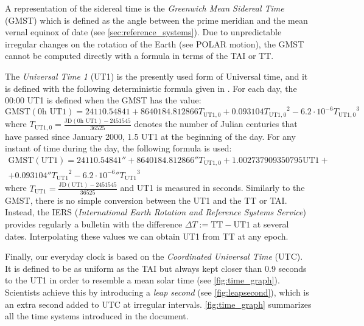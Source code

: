 \documentclass[../main.tex]{subfiles}
\begin{document}
A representation of the sidereal time is the \emph{Greenwich Mean Sidereal Time} (GMST) which is defined as the angle between the prime meridian and the mean vernal equinox of date (see \cref{sec:reference_systems}). Due to unpredictable irregular changes on the rotation of the Earth (see POLAR motion), the GMST cannot be computed directly with a formula in terms of the TAI or TT.

The \emph{Universal Time 1} (UT1) is the presently used form of Universal time, and it is defined with the following deterministic formula given in \cite{aoki}. For each day, the 00:00 UT1 is defined when the GMST has the value:
\begin{equation}
  \mathrm{GMST}(0\text{h UT1})=24110.54841+8640184.812866{T_{\text{UT1},0}}+0.093104{T_{\text{UT1},0}}^2-6.2\cdot 10^{-6}{T_{\text{UT1},0}}^3
\end{equation}
where $T_{\text{UT1},0}=\frac{\text{JD}(0\text{h UT1})-2451545}{36525}$ denotes the number of Julian centuries that have passed since January 2000, 1.5 UT1 at the beginning of the day. For any instant of time during the day, the following formula is used:
\begin{multline}
  \mathrm{GMST}(\mathrm{UT1})=24110.54841''+8640184.812866''{T_{\text{UT1},0}}+1.002737909350795\text{UT1}+\\+0.093104''{T_{\text{UT1}}}^2-{6.2\cdot 10^{-6}}''{T_{\text{UT1}}}^3
\end{multline}
where $T_\text{UT1}=\frac{\text{JD}(\text{UT1})-2451545}{36525}$ and UT1 is measured in seconds. Similarly to the GMST, there is no simple conversion between the UT1 and the TT or TAI. Instead, the IERS (\emph{International Earth Rotation and Reference Systems Service}) provides regularly a bulletin with the difference $\Delta T:= \mathrm{TT}-\mathrm{UT1}$ at several dates. Interpolating these values we can obtain UT1 from TT at any epoch.

Finally, our everyday clock is based on the \emph{Coordinated Universal Time} (UTC). It is defined to be as uniform as the TAI but always kept closer than 0.9 seconds to the UT1 in order to resemble a mean solar time (see \cref{fig:time_graph}). Scientists achieve this by introducing a \emph{leap second} (see \cref{fig:leapsecond}), which is an extra second added to UTC at irregular intervals. \cref{fig:time_graph} summarizes all the time systems introduced in the document.
\end{document}
